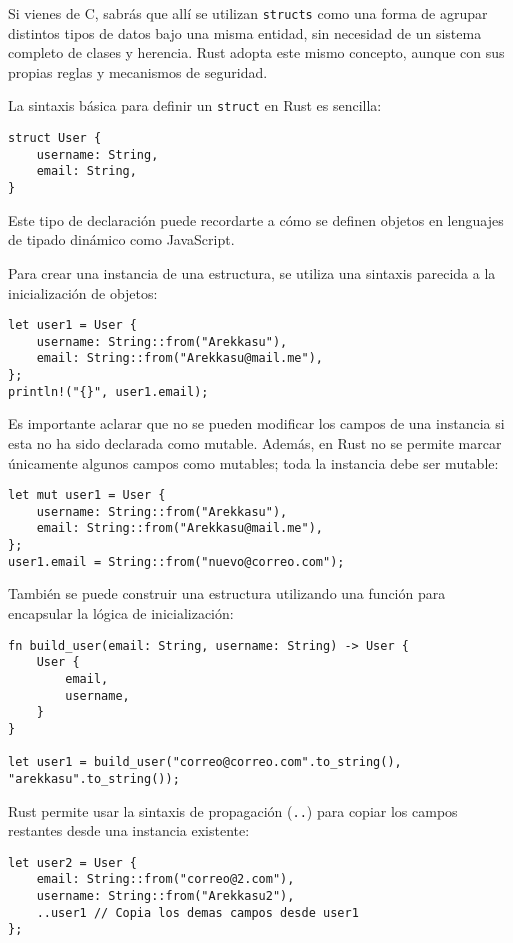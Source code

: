 \documentclass[12pt]{article}
\begin{document}
Si vienes de C, sabrás que allí se utilizan \texttt{structs} como una forma de agrupar distintos tipos de datos bajo una misma entidad, sin necesidad de un sistema completo de clases y herencia. Rust adopta este mismo concepto, aunque con sus propias reglas y mecanismos de seguridad.

La sintaxis básica para definir un \texttt{struct} en Rust es sencilla:

\begin{lstlisting}[style=ruststyle]
struct User {
	username: String,
	email: String,
}
\end{lstlisting}

Este tipo de declaración puede recordarte a cómo se definen objetos en lenguajes de tipado dinámico como JavaScript.

Para crear una instancia de una estructura, se utiliza una sintaxis parecida a la inicialización de objetos:

\begin{lstlisting}[style=ruststyle]
let user1 = User {
	username: String::from("Arekkasu"),
	email: String::from("Arekkasu@mail.me"),
};
println!("{}", user1.email);
\end{lstlisting}

Es importante aclarar que no se pueden modificar los campos de una instancia si esta no ha sido declarada como mutable. Además, en Rust no se permite marcar únicamente algunos campos como mutables; toda la instancia debe ser mutable:

\begin{lstlisting}[style=ruststyle]
let mut user1 = User {
	username: String::from("Arekkasu"),
	email: String::from("Arekkasu@mail.me"),
};
user1.email = String::from("nuevo@correo.com");
\end{lstlisting}

También se puede construir una estructura utilizando una función para encapsular la lógica de inicialización:

\begin{lstlisting}[style=ruststyle]
fn build_user(email: String, username: String) -> User {
	User {
		email,
		username,
	}
}
	
let user1 = build_user("correo@correo.com".to_string(), "arekkasu".to_string());
\end{lstlisting}

Rust permite usar la sintaxis de propagación (\texttt{..}) para copiar los campos restantes desde una instancia existente:

\begin{lstlisting}[style=ruststyle]
let user2 = User {
	email: String::from("correo@2.com"),
	username: String::from("Arekkasu2"),
	..user1 // Copia los demas campos desde user1
};
\end{lstlisting}
\end{document}
